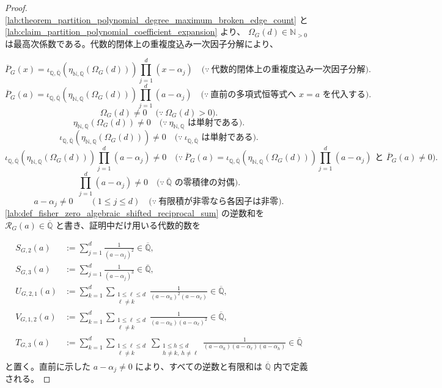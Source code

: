 \documentclass[11pt,a4paper]{article}
\theoremstyle{remark}
\begin{document}
\begin{proof}
\cref{lab:theorem_partition_polynomial_degree_maximum_broken_edge_count}
 と
\cref{lab:claim_partition_polynomial_coefficient_expansion}
 より、
$\Omega_G(d)\in\mathbb N_{>0}$
 は最高次係数である。代数的閉体上の重複度込み一次因子分解により、

\[\overline P_G(x)
=
\iota_{\mathbb Q,\overline{\mathbb Q}}\!\left(
  \eta_{\mathbb N,\mathbb Q}\!\left(\Omega_G(d)\right)
\right)
\prod_{j=1}^{d}(x-\alpha_j)
\quad\bigl(\because\ \text{代数的閉体上の重複度込み一次因子分解}\bigr).\]
\[\overline P_G(a)
=
\iota_{\mathbb Q,\overline{\mathbb Q}}\!\left(
  \eta_{\mathbb N,\mathbb Q}\!\left(\Omega_G(d)\right)
\right)
\prod_{j=1}^{d}(a-\alpha_j)
\quad\bigl(\because\ \text{直前の多項式恒等式へ }x=a\text{ を代入する}\bigr).\]
\[\Omega_G(d)\ne0
\quad\bigl(\because\ \Omega_G(d)>0\bigr).\]
\[\eta_{\mathbb N,\mathbb Q}\!\left(\Omega_G(d)\right)
\ne0
\quad\bigl(\because\ \eta_{\mathbb N,\mathbb Q}\text{ は単射である}\bigr).\]
\[\iota_{\mathbb Q,\overline{\mathbb Q}}\!\left(
  \eta_{\mathbb N,\mathbb Q}\!\left(\Omega_G(d)\right)
\right)
\ne0
\quad\bigl(\because\ \iota_{\mathbb Q,\overline{\mathbb Q}}\text{ は単射である}\bigr).\]
\[\iota_{\mathbb Q,\overline{\mathbb Q}}\!\left(
  \eta_{\mathbb N,\mathbb Q}\!\left(\Omega_G(d)\right)
\right)
\prod_{j=1}^{d}(a-\alpha_j)
\ne0
\quad\bigl(\because\ \overline P_G(a)
=\iota_{\mathbb Q,\overline{\mathbb Q}}(\eta_{\mathbb N,\mathbb Q}(\Omega_G(d)))
\prod_{j=1}^{d}(a-\alpha_j)\text{ と }\overline P_G(a)\ne0\bigr).\]
\[\prod_{j=1}^{d}(a-\alpha_j)
\ne0
\quad\bigl(\because\ \overline{\mathbb Q}\text{ の零積律の対偶}\bigr).\]
\[a-\alpha_j\ne0
\qquad(1\le j\le d)
\quad\bigl(\because\ \text{有限積が非零なら各因子は非零}\bigr).\]
\cref{lab:def_fisher_zero_algebraic_shifted_reciprocal_sum}
 の逆数和を
$\mathcal R_G(a)\in\overline{\mathbb Q}$
 と書き、証明中だけ用いる代数的数を

\[\begin{aligned}
S_{G,2}(a)
&:=\sum_{j=1}^{d}\frac{1}{(a-\alpha_j)^2}
\in\overline{\mathbb Q},\\
S_{G,3}(a)
&:=\sum_{j=1}^{d}\frac{1}{(a-\alpha_j)^3}
\in\overline{\mathbb Q},\\
U_{G,2,1}(a)
&:=
\sum_{k=1}^{d}
\sum_{\substack{1\le\ell\le d\\\ell\ne k}}
\frac{1}{(a-\alpha_k)^2(a-\alpha_\ell)}
\in\overline{\mathbb Q},\\
V_{G,1,2}(a)
&:=
\sum_{k=1}^{d}
\sum_{\substack{1\le\ell\le d\\\ell\ne k}}
\frac{1}{(a-\alpha_k)(a-\alpha_\ell)^2}
\in\overline{\mathbb Q},\\
T_{G,3}(a)
&:=
\sum_{k=1}^{d}
\sum_{\substack{1\le\ell\le d\\\ell\ne k}}
\sum_{\substack{1\le h\le d\\h\ne k,\ h\ne\ell}}
\frac{1}{(a-\alpha_k)(a-\alpha_\ell)(a-\alpha_h)}
\in\overline{\mathbb Q}
\end{aligned}\]
と置く。直前に示した
$a-\alpha_j\ne0$
により、すべての逆数と有限和は
$\overline{\mathbb Q}$
 内で定義される。


\end{proof}
\end{document}

